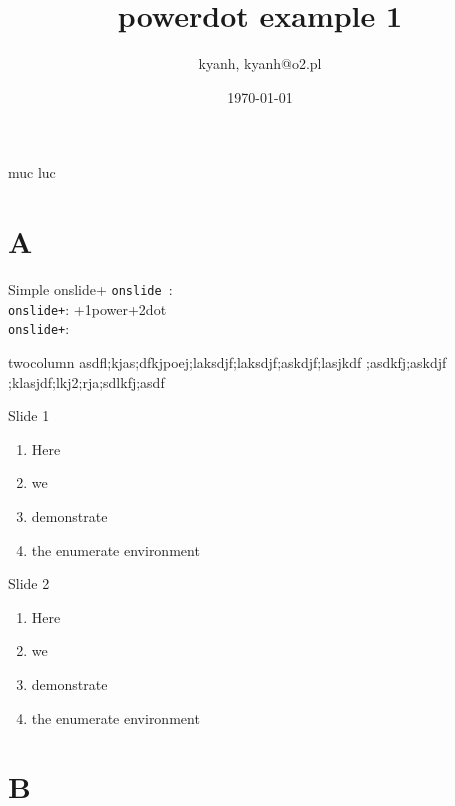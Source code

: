 \IfFileExists{./header.tex}{}{\documentclass[a4paper,style=default]{powerdot}}
\title{powerdot example 1}
\author{kyanh, kyanh@o2.pl}
\date{\today}
\begin{document}
\maketitle

\begin{slide}{muc luc}
\tableofcontents
\end{slide}

\section{A}

\begin{slide}{Simple onslide+}
 \texttt{onslide }: \\
 \texttt{onslide+}: \onslide+{1}{power}\onslide+{2}{dot}\\
 \texttt{onslide+}: \\
\end{slide}

\begin{slide}{twocolumn}
%
	{asdfl;kjas;dfkjpoej;laksdjf;laksdjf;askdjf;lasjkdf}%
	{;asdkfj;askdjf ;klasjdf;lkj2;rja;sdlkfj;asdf}
\end{slide}

\begin{slide}{Slide 1}
  \begin{enumerate}[type=1]
    \item Here
      \item we
        \item demonstrate
          \item the enumerate environment
  \end{enumerate}
\end{slide}

\begin{slide}{Slide 2}
  \begin{enumerate}[type=0]
    \item<1-> Here
      \item<2-> we
        \item<3-> demonstrate
          \item<4-> the enumerate environment
  \end{enumerate}
\end{slide}

\section{B}
\end{document}
